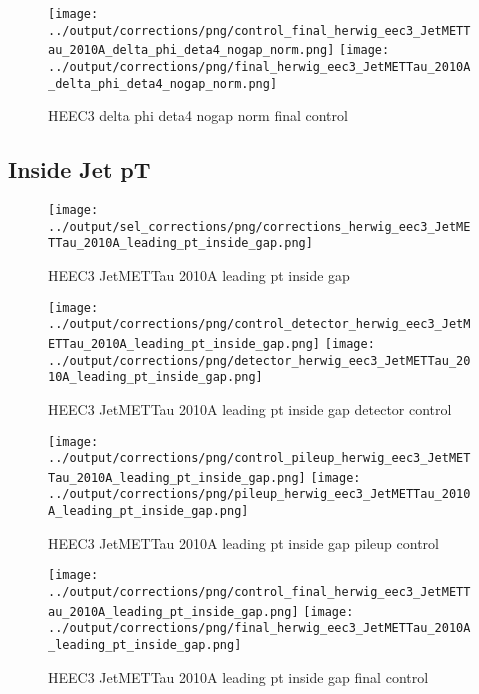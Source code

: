 \documentclass[11pt]{book}
\begin{document}
\begin{figure}[ht]
\centering
\texttt{[image: ../output/corrections/png/control\_final\_herwig\_eec3\_JetMETTau\_2010A\_delta\_phi\_deta4\_nogap\_norm.png]}
\texttt{[image: ../output/corrections/png/final\_herwig\_eec3\_JetMETTau\_2010A\_delta\_phi\_deta4\_nogap\_norm.png]}
\caption{HEEC3 delta phi deta4 nogap norm final control}
\label{fig:HEEC3_JetMETTau_2010A_delta_phi_deta4_nogap_norm_final_control}
\end{figure}

\clearpage
\subsection{Inside Jet pT}
\begin{figure}[ht]
\centering
\texttt{[image: ../output/sel\_corrections/png/corrections\_herwig\_eec3\_JetMETTau\_2010A\_leading\_pt\_inside\_gap.png]}
\caption{HEEC3 JetMETTau 2010A leading pt inside gap}
\label{fig:HEEC3_JetMETTau_2010A_leading_pt_inside_gap}
\end{figure}

\begin{figure}[ht]
\centering
\texttt{[image: ../output/corrections/png/control\_detector\_herwig\_eec3\_JetMETTau\_2010A\_leading\_pt\_inside\_gap.png]}
\texttt{[image: ../output/corrections/png/detector\_herwig\_eec3\_JetMETTau\_2010A\_leading\_pt\_inside\_gap.png]}
\caption{HEEC3 JetMETTau 2010A leading pt inside gap detector control}
\label{fig:HEEC3_JetMETTau_2010A_leading_pt_inside_gap_detector_control}
\end{figure}

\begin{figure}[ht]
\centering
\texttt{[image: ../output/corrections/png/control\_pileup\_herwig\_eec3\_JetMETTau\_2010A\_leading\_pt\_inside\_gap.png]}
\texttt{[image: ../output/corrections/png/pileup\_herwig\_eec3\_JetMETTau\_2010A\_leading\_pt\_inside\_gap.png]}
\caption{HEEC3 JetMETTau 2010A leading pt inside gap pileup control}
\label{fig:HEEC3_JetMETTau_2010A_leading_pt_inside_gap_pileup_control}
\end{figure}


\begin{figure}[ht]
\centering
\texttt{[image: ../output/corrections/png/control\_final\_herwig\_eec3\_JetMETTau\_2010A\_leading\_pt\_inside\_gap.png]}
\texttt{[image: ../output/corrections/png/final\_herwig\_eec3\_JetMETTau\_2010A\_leading\_pt\_inside\_gap.png]}
\caption{HEEC3 JetMETTau 2010A leading pt inside gap final control}
\label{fig:HEEC3_JetMETTau_2010A_leading_pt_inside_gap_final_control}
\end{figure}
\end{document}
